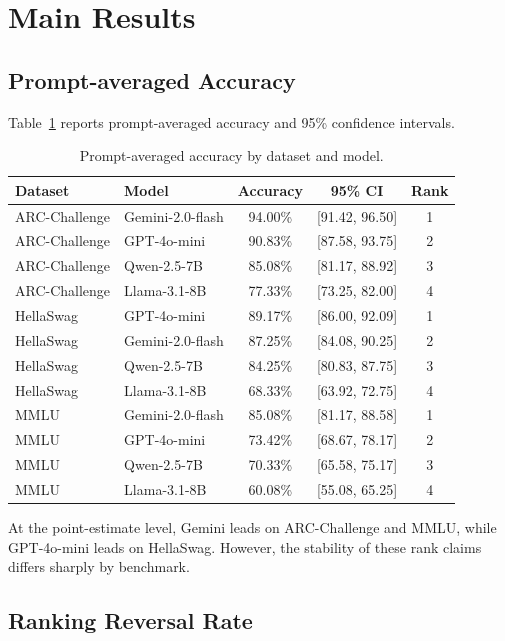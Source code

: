 \documentclass[11pt]{article}
\begin{document}
\section{Main Results}

\subsection{Prompt-averaged Accuracy}

Table~\ref{tab:accuracy} reports prompt-averaged accuracy and 95\% confidence intervals.

\begin{table}[H]
\centering
\caption{Prompt-averaged accuracy by dataset and model.}
\label{tab:accuracy}
\begin{tabular}{llccc}
\toprule
Dataset & Model & Accuracy & 95\% CI & Rank \\
\midrule
ARC-Challenge & Gemini-2.0-flash & 94.00\% & [91.42, 96.50] & 1 \\
ARC-Challenge & GPT-4o-mini & 90.83\% & [87.58, 93.75] & 2 \\
ARC-Challenge & Qwen-2.5-7B & 85.08\% & [81.17, 88.92] & 3 \\
ARC-Challenge & Llama-3.1-8B & 77.33\% & [73.25, 82.00] & 4 \\
HellaSwag & GPT-4o-mini & 89.17\% & [86.00, 92.09] & 1 \\
HellaSwag & Gemini-2.0-flash & 87.25\% & [84.08, 90.25] & 2 \\
HellaSwag & Qwen-2.5-7B & 84.25\% & [80.83, 87.75] & 3 \\
HellaSwag & Llama-3.1-8B & 68.33\% & [63.92, 72.75] & 4 \\
MMLU & Gemini-2.0-flash & 85.08\% & [81.17, 88.58] & 1 \\
MMLU & GPT-4o-mini & 73.42\% & [68.67, 78.17] & 2 \\
MMLU & Qwen-2.5-7B & 70.33\% & [65.58, 75.17] & 3 \\
MMLU & Llama-3.1-8B & 60.08\% & [55.08, 65.25] & 4 \\
\bottomrule
\end{tabular}
\end{table}

At the point-estimate level, Gemini leads on ARC-Challenge and MMLU, while GPT-4o-mini leads on HellaSwag. However, the stability of these rank claims differs sharply by benchmark.

\subsection{Ranking Reversal Rate}
\end{document}

